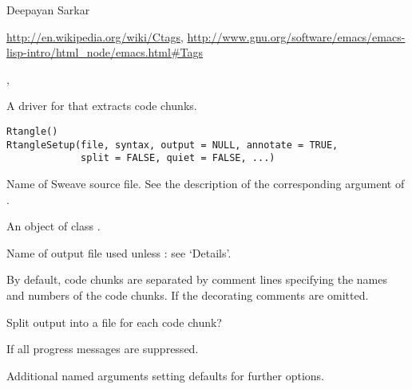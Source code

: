 %
\begin{Author}\relax
Deepayan Sarkar
\end{Author}
%
\begin{References}\relax
\url{http://en.wikipedia.org/wiki/Ctags},
\url{http://www.gnu.org/software/emacs/emacs-lisp-intro/html_node/emacs.html#Tags}
\end{References}
%
\begin{SeeAlso}\relax
 ,  
\end{SeeAlso}
%
\begin{Examples}
\end{Examples}
%
\begin{Description}\relax
A driver for  that extracts \R{} code chunks.
\end{Description}
%
\begin{Usage}
\begin{verbatim}
Rtangle()
RtangleSetup(file, syntax, output = NULL, annotate = TRUE,
             split = FALSE, quiet = FALSE, ...)
\end{verbatim}
\end{Usage}
%
\begin{Arguments}
\begin{ldescription}
\item[\code{file}] Name of Sweave source file.  See the description of the
corresponding argument of .
\item[\code{syntax}] An object of class .
\item[\code{output}] Name of output file used unless :
see `Details'.
\item[\code{annotate}] By default, code chunks are separated by comment
lines specifying the names and numbers of the code chunks.  If
 the decorating comments are omitted.
\item[\code{split}] Split output into a file for each code chunk?
\item[\code{quiet}] If  all progress messages are suppressed.
\item[\code{...}] Additional named arguments setting defaults for further
options.
\end{ldescription}
\end{Arguments}
